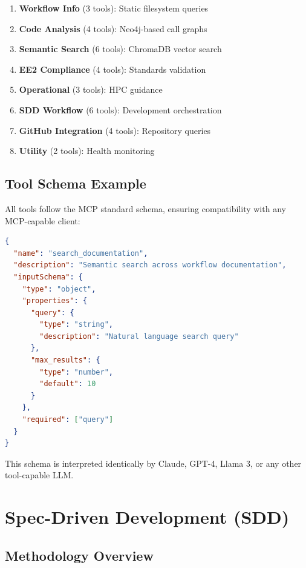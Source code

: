 \documentclass[11pt,twocolumn]{article}
\begin{document}
\begin{enumerate}
    \item \textbf{Workflow Info} (3 tools): Static filesystem queries
    \item \textbf{Code Analysis} (4 tools): Neo4j-based call graphs
    \item \textbf{Semantic Search} (6 tools): ChromaDB vector search
    \item \textbf{EE2 Compliance} (4 tools): Standards validation
    \item \textbf{Operational} (3 tools): HPC guidance
    \item \textbf{SDD Workflow} (6 tools): Development orchestration
    \item \textbf{GitHub Integration} (4 tools): Repository queries
    \item \textbf{Utility} (2 tools): Health monitoring
\end{enumerate}

\subsection{Tool Schema Example}

All tools follow the MCP standard schema, ensuring compatibility with any MCP-capable client:

\begin{lstlisting}[language=json,caption=MCP Tool Schema (Provider-Agnostic)]
{
  "name": "search_documentation",
  "description": "Semantic search across workflow documentation",
  "inputSchema": {
    "type": "object",
    "properties": {
      "query": {
        "type": "string",
        "description": "Natural language search query"
      },
      "max_results": {
        "type": "number",
        "default": 10
      }
    },
    "required": ["query"]
  }
}
\end{lstlisting}

This schema is interpreted identically by Claude, GPT-4, Llama 3, or any other tool-capable LLM.

\section{Spec-Driven Development (SDD)}

\subsection{Methodology Overview}
\end{document}
